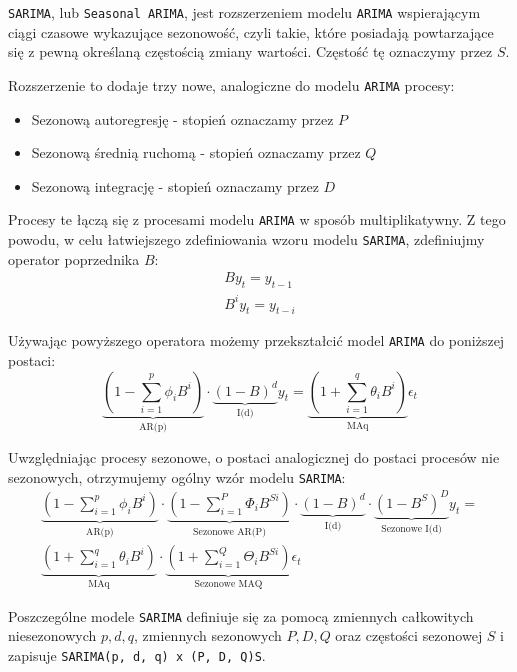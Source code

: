 \documentclass[12pt]{article}
\begin{document}
\texttt{SARIMA}, lub \texttt{Seasonal ARIMA}, jest rozszerzeniem modelu \texttt{ARIMA} wspierającym ciągi czasowe wykazujące sezonowość, czyli takie, które posiadają powtarzające się z pewną określaną częstością zmiany wartości. Częstość tę oznaczymy przez $S$.

Rozszerzenie to dodaje trzy nowe, analogiczne do modelu \texttt{ARIMA} procesy:
\begin{itemize}
    \item Sezonową autoregresję - stopień oznaczamy przez $P$
    \item Sezonową średnią ruchomą - stopień oznaczamy przez $Q$
    \item Sezonową integrację - stopień oznaczamy przez $D$
\end{itemize}
Procesy te łączą się z procesami modelu \texttt{ARIMA} w sposób multiplikatywny. Z tego powodu, w celu łatwiejszego zdefiniowania wzoru modelu \texttt{SARIMA}, zdefiniujmy operator poprzednika $B$:
\begin{gather*}
    By_t = y_{t-1} \\
    B^iy_t = y_{t-i}
\end{gather*}

Używając powyższego operatora możemy przekształcić model \texttt{ARIMA} do poniższej postaci:
\[
    \underbrace{\left(1 - \sum^p_{i=1} \phi_iB^i \right)}_\text{AR(p)}
    \cdot
    \underbrace{(1 - B)^d}_\text{I(d)}
    y_t =
    \underbrace{\left(1 + \sum^q_{i=1} \theta_iB^i \right)}_\text{MA{q}}
    \epsilon_t
\]

Uwzględniając procesy sezonowe, o postaci analogicznej do postaci procesów nie sezonowych, otrzymujemy ogólny wzór modelu \texttt{SARIMA}:
\begin{gather*}
    \underbrace{\left(1 - \sum^p_{i=1} \phi_iB^i \right)}_\text{AR(p)}
    \cdot
    \underbrace{\left(1 - \sum^P_{i=1} \Phi_iB^{Si} \right)}_\text{Sezonowe AR(P)}
    \cdot
    \underbrace{(1 - B)^d}_\text{I(d)}
    \cdot
    \underbrace{(1 - B^S)^D}_\text{Sezonowe I(d)}
    y_t = \\
    \underbrace{\left(1 + \sum^q_{i=1} \theta_iB^i \right)}_\text{MA{q}}
    \cdot
    \underbrace{\left(1 + \sum^Q_{i=1} \Theta_iB^{Si} \right)}_\text{Sezonowe MA{Q}}
    \epsilon_t
\end{gather*}

Poszczególne modele \texttt{SARIMA} definiuje się za pomocą zmiennych całkowitych niesezonowych $p, d, q$, zmiennych sezonowych $P, D, Q$ oraz częstości sezonowej $S$ i zapisuje \texttt{SARIMA(p, d, q) x (P, D, Q)S}.
\end{document}

